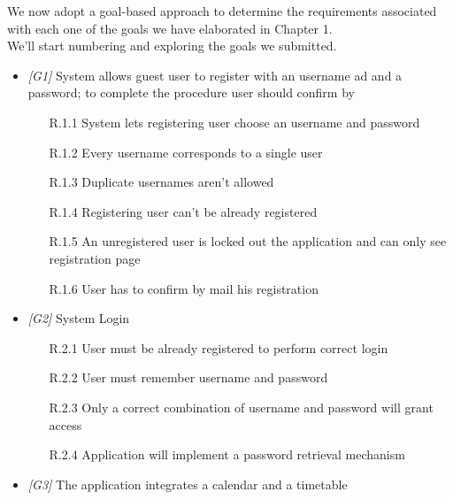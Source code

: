 We now adopt a goal-based approach to determine the requirements associated with each one of the goals we have elaborated in Chapter 1.\\
We'll start numbering and exploring the goals we submitted.

\begin{itemize}

            \item \textit{[G1]} System allows guest user to register with an username ad and a password; to complete the procedure user should confirm by 
               
                  \begin{itemize}
                        \item [R.1.1] System lets registering user choose an username and password
                        \item [R.1.2] Every username corresponds to a single user
                        \item [R.1.3] Duplicate usernames aren’t allowed
                        \item [R.1.4] Registering user can't be already registered
                        \item [R.1.5] An unregistered user is locked out the application and can only see registration page
                        \item [R.1.6] User has to confirm by mail his registration
                  \end{itemize}
             
\item \textit{[G2]} System Login

                  \begin{itemize}
                        \item [R.2.1] User must be already registered to perform correct login
                        \item [R.2.2] User must remember username and password
                        \item [R.2.3] Only a correct combination of username and password will grant access
                        \item [R.2.4] Application will implement a password retrieval mechanism
                  \end{itemize}
                  
                  
\item \textit{[G3]} The application integrates a calendar and a timetable


\end{itemize}
